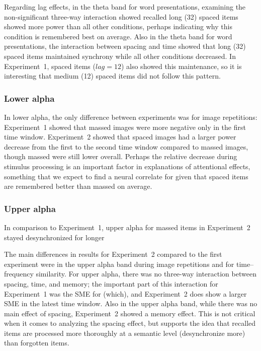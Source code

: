 Regarding lag effects, in the theta band for word presentations, examining the non-significant three-way interaction showed recalled long (32) spaced items showed more power than all other conditions, perhaps indicating why this condition is remembered best on average.
Also in the theta band for word presentations, the interaction between spacing and time showed that long (32) spaced items maintained synchrony while all other conditions decreased.  In Experiment~1, spaced items ($lag=12$) also showed this maintenance, so it is interesting that medium (12) spaced items did not follow this pattern.


\subsubsection{Lower alpha}

In lower alpha, the only difference between experiments was for image repetitions: Experiment~1 showed that massed images were more negative only in the first time window.  Experiment~2 showed that spaced images had a larger power decrease from the first to the second time window compared to massed images, though massed were still lower overall.  Perhaps the relative decrease during stimulus processing is an important factor in explanations of attentional effects, something that we expect to find a neural correlate for given that spaced items are remembered better than massed on average.


\subsubsection{Upper alpha}

In comparison to Experiment~1, upper alpha for massed items in Experiment~2 stayed desynchronized for longer


The main differences in results for Experiment~2 compared to the first experiment were in the upper alpha band during image repetitions and for time--frequency similarity.  For upper alpha, there was no three-way interaction between spacing, time, and memory; the important part of this interaction for Experiment~1 was the SME for (which), and Experiment~2 does show a larger SME in the latest time window.  Also in the upper alpha band, while there was no main effect of spacing, Experiment~2 showed a memory effect.  This is not critical when it comes to analyzing the spacing effect, but supports the idea that recalled items are processed more thoroughly at a semantic level (desynchronize more) than forgotten items.


